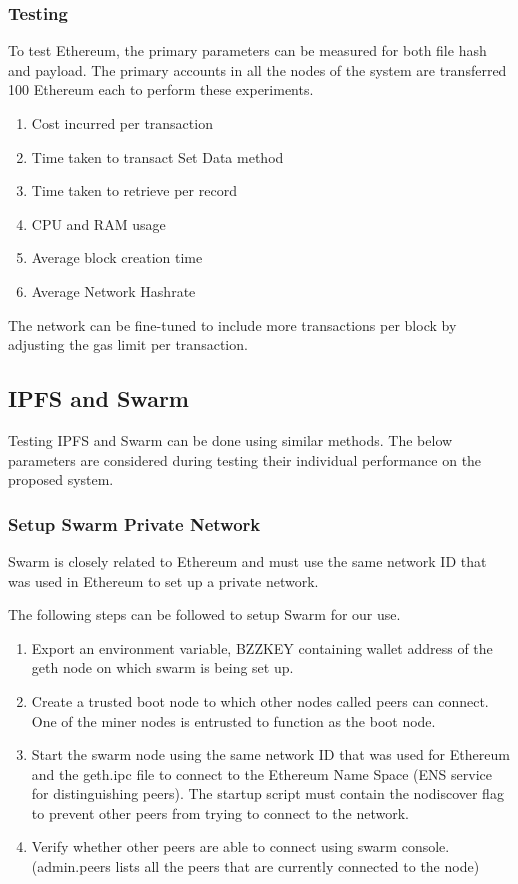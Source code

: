 \documentclass[11pt,openright]{report}
\begin{document}
\subsubsection{Testing}
To test Ethereum, the primary parameters can be measured for both file hash and payload. The primary accounts in all the nodes of the system are transferred 100 Ethereum each to perform these experiments. 
\begin{enumerate}
    \item Cost incurred per transaction
    \item Time taken to transact Set Data method
    \item Time taken to retrieve per record
    \item CPU and RAM usage
    \item Average block creation time
    \item Average Network Hashrate
\end{enumerate}
The network can be fine-tuned to include more transactions per block by adjusting the gas limit per transaction.

\subsection{IPFS and Swarm}
Testing IPFS and Swarm can be done using similar methods. The below parameters are considered during testing their individual performance on the proposed system. 

\subsubsection{Setup Swarm Private Network}
Swarm is closely related to Ethereum and must use the same network ID that was used in Ethereum to set up a private network.

The following steps can be followed to setup Swarm for our use.
\begin{enumerate}
    \item Export an environment variable, BZZKEY containing wallet address of the geth node on which swarm is being set up.
    \item Create a trusted boot node to which other nodes called peers can connect. One of the miner nodes is entrusted to function as the boot node.
    \item Start the swarm node using the same network ID that was used for Ethereum and the geth.ipc file to connect to the Ethereum Name Space (ENS service for distinguishing peers). The startup script must contain the nodiscover flag to prevent other peers from trying to connect to the network.
    \item Verify whether other peers are able to connect using swarm console. (admin.peers lists all the peers that are currently connected to the node)
\end{enumerate}
\end{document}
